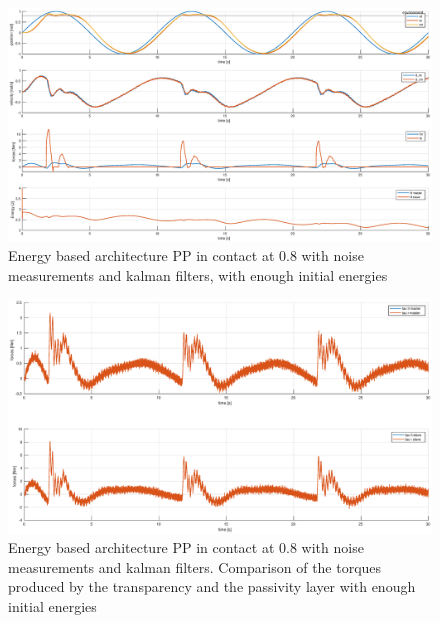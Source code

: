 \documentclass[a4paper,12pt]{article}
\begin{document}
\begin{figure}[H]
    \begin{center}
        \hspace*{-4.5cm}
        \includegraphics[scale=0.5]{images/energy_pp_kalman.eps}
    \end{center}
    \caption{Energy based architecture PP in contact at 0.8 with noise measurements and kalman filters, with enough initial energies}
    \label{fig:energy_pp_kalman}
\end{figure}

\begin{figure}[H]
    \begin{center}
        \hspace*{-4.5cm}
        \includegraphics[scale=0.5]{images/energy_pp_tau_kalman.eps}
    \end{center}
    \caption{Energy based architecture PP in contact at 0.8 with noise measurements and kalman filters. Comparison of the torques produced by the transparency and the passivity layer with enough initial energies}
    \label{fig:energy_pp_tau_kalman}
\end{figure}
\end{document}
